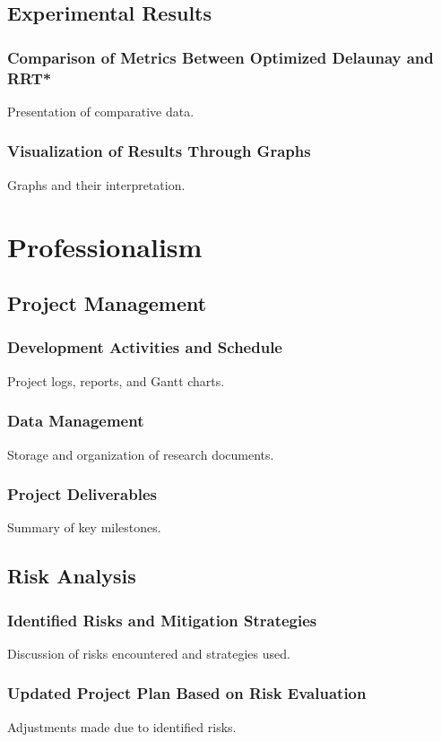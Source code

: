 \documentclass[a4paper,11pt]{report}
\begin{document}
\section{Experimental Results}
\subsection{Comparison of Metrics Between Optimized Delaunay and RRT*}
Presentation of comparative data.

\subsection{Visualization of Results Through Graphs}
Graphs and their interpretation.

\newpage

\chapter{Professionalism}
\section{Project Management}
\subsection{Development Activities and Schedule}
Project logs, reports, and Gantt charts.

\subsection{Data Management}
Storage and organization of research documents.

\subsection{Project Deliverables}
Summary of key milestones.

\section{Risk Analysis}
\subsection{Identified Risks and Mitigation Strategies}
Discussion of risks encountered and strategies used.

\subsection{Updated Project Plan Based on Risk Evaluation}
Adjustments made due to identified risks.
\end{document}
